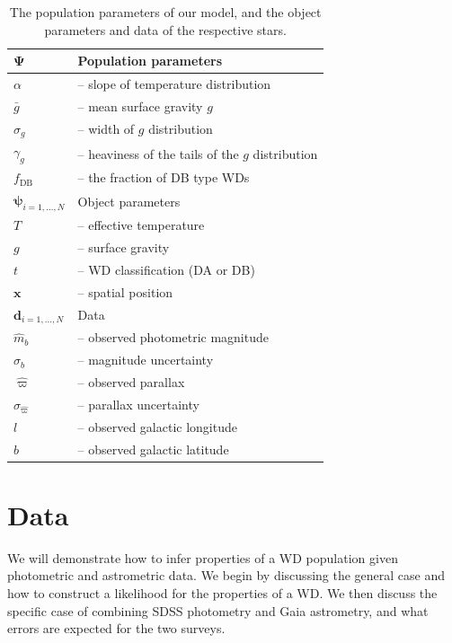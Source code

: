 \documentclass[fleqn,usenatbib]{mnras}
\newcommand{\popp}{\boldsymbol{\Psi}}
\newcommand{\objp}{\boldsymbol{\psi}}
\newcommand{\data}{\mathbf{d}}
\newcommand{\Teff}{T}
\newcommand{\logg}{g}
\begin{document}
\begin{table}
	\centering
	\caption{The population parameters of our model, and the object parameters and data of the respective stars.}
	\label{tab:parameters}
    \begin{tabular}{l l}
		\hline
		$\popp$  & Population parameters \\
		\hline
		$\alpha$ & -- slope of temperature distribution \\
		$\bar{g}$ & -- mean surface gravity $\logg$ \\
		$\sigma_g$ & -- width of $\logg$ distribution \\
		$\gamma_g$ & -- heaviness of the tails of the $\logg$ distribution \\
		$f_\text{DB}$ & -- the fraction of DB type WDs \\
        \hline
        $\objp_{i=1,...,N}$  & Object parameters \\
        \hline
        $\Teff$ & -- effective temperature \\
        $\logg$ & -- surface gravity \\
        $t$ & -- WD classification (DA or DB) \\
        $\mathbf{x}$ & -- spatial position  \\
        \hline
        $\data_{i=1,...,N}$ & Data \\
        \hline
        $\hat{m}_b$ & -- observed photometric magnitude \\
        $\sigma_b$ & -- magnitude uncertainty \\
        $\hat{\varpi}$ & -- observed parallax \\
        $\sigma_{\hat{\varpi}}$ & -- parallax uncertainty \\
        $l$ & -- observed galactic longitude \\
        $b$ & -- observed galactic latitude \\
		\hline
	\end{tabular}
\end{table}




\section{Data}\label{sec:data}

We will demonstrate how to infer properties of a WD population given photometric and astrometric data. We begin by discussing the general case and how to construct a likelihood for the properties of a WD. We then discuss the specific case of combining SDSS photometry and Gaia astrometry, and what errors are expected for the two surveys.
\end{document}
